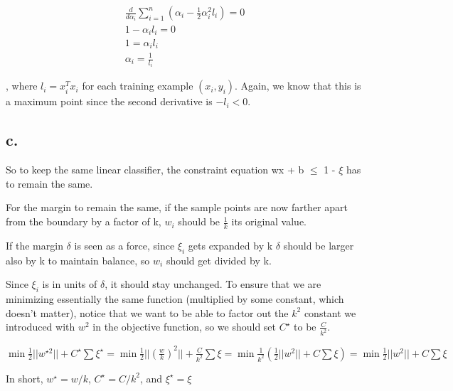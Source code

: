 \documentclass[]{article}
\begin{document}
\begin{align*}
\frac{d}{d\alpha_i} \sum_{i=1}^n\left(\alpha_i - \frac{1}{2}\alpha_i^{2} l_i\right) = 0 \\
1 - \alpha_i l_i = 0 \\
1 = \alpha_i l_i \\
\alpha_i = \frac{1}{l_i} 
\end{align*}


, where $l_i = x_i^Tx_i$ for each training example $(x_i, y_i)$. Again, we know that this is a maximum point since the second derivative is $-l_i < 0$.

\subsection{c.}

So to keep the same linear classifier, the constraint equation wx + b
$\le$ 1 - $\xi$ has to remain the same. 

For the margin to remain the
same, if the sample points are now farther apart from the boundary by
a factor of k, $w_i$ should be $\frac{1}{k}$ its original value.

If the margin $\delta$ is seen as a force, since $\xi_i$ gets expanded by
k $\delta$ should be larger also by k to maintain balance, so $w_i$
should get divided by k.

Since $\xi_i$ is in units of $\delta$, it
should stay unchanged. To ensure that we are minimizing essentially the same function (multiplied by some constant, which doesn't matter), notice that we want to be able to factor out the $k^2$ constant we introduced with $w^2$ in the objective function, so we should set $C^\star$ to be $\frac{C}{k^2}$.

$\min \frac{1}{2}||w^{\star 2}|| + C^\star \sum \xi^\star = \min \frac{1}{2}||(\frac{w}{k})^2|| + \frac{C}{k^2}\sum \xi = \min \frac{1}{k^2}(\frac{1}{2}||w^2|| + C \sum \xi) = \min \frac{1}{2}||w^2|| + C \sum \xi$

In short, $w^\star = w/k$, $C^\star = C/k^2$, and $\xi^\star = \xi$
\end{document}
